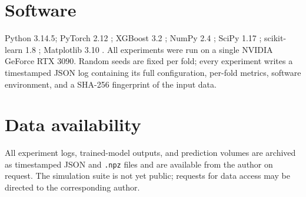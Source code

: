 \documentclass[fleqn,usenatbib]{rasti}
\begin{document}
\section*{Software}

Python 3.14.5; PyTorch 2.12 \citep{Paszke2019}; XGBoost 3.2
\citep{Chen2016}; NumPy 2.4 \citep{Harris2020}; SciPy 1.17
\citep{Virtanen2020}; scikit-learn 1.8 \citep{Pedregosa2011};
Matplotlib 3.10 \citep{Hunter2007}. All experiments were run on a single
NVIDIA GeForce RTX 3090. Random seeds are fixed per fold; every
experiment writes a timestamped JSON log containing its full
configuration, per-fold metrics, software environment, and a SHA-256
fingerprint of the input data.

\section*{Data availability}

All experiment logs, trained-model outputs, and prediction volumes are
archived as timestamped JSON and \texttt{.npz} files and are available
from the author on request. The simulation suite is not yet public;
requests for data access may be directed to the corresponding author.




\label{lastpage}
\end{document}
